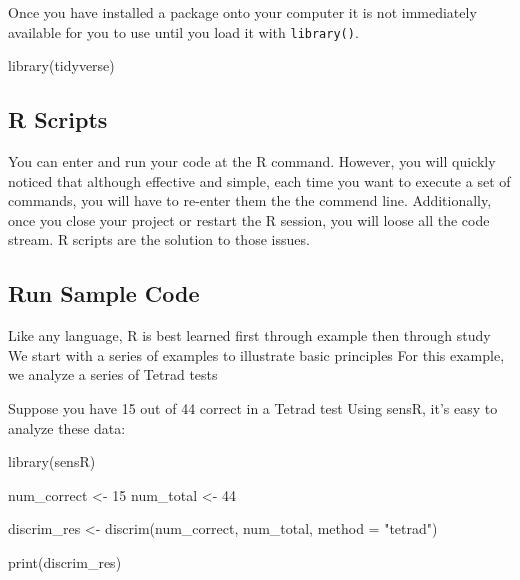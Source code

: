 \documentclass[
]{book}
\newenvironment{Shaded}{\begin{snugshade}}{\end{snugshade}}
\newcommand{\AttributeTok}[1]{\textcolor[rgb]{0.77,0.63,0.00}{#1}}
\newcommand{\DecValTok}[1]{\textcolor[rgb]{0.00,0.00,0.81}{#1}}
\newcommand{\FunctionTok}[1]{\textcolor[rgb]{0.00,0.00,0.00}{#1}}
\newcommand{\NormalTok}[1]{#1}
\newcommand{\OtherTok}[1]{\textcolor[rgb]{0.56,0.35,0.01}{#1}}
\newcommand{\StringTok}[1]{\textcolor[rgb]{0.31,0.60,0.02}{#1}}
\begin{document}
Once you have installed a package onto your computer it is not immediately available for you to use until you load it with \texttt{library()}.

\begin{Shaded}
\begin{Highlighting}[]
\FunctionTok{library}\NormalTok{(tidyverse)}
\end{Highlighting}
\end{Shaded}

\hypertarget{r-scripts}{%
\subsection{R Scripts}\label{r-scripts}}

You can enter and run your code at the R command. However, you will quickly noticed that although effective and simple, each time you want to execute a set of commands, you will have to re-enter them the the commend line. Additionally, once you close your project or restart the R session, you will loose all the code stream. R scripts are the solution to those issues.

\hypertarget{run-sample-code}{%
\subsection{Run Sample Code}\label{run-sample-code}}

Like any language, R is best learned first through example then through study
We start with a series of examples to illustrate basic principles
For this example, we analyze a series of Tetrad tests

Suppose you have 15 out of 44 correct in a Tetrad test
Using sensR, it's easy to analyze these data:

\begin{Shaded}
\begin{Highlighting}[]
\FunctionTok{library}\NormalTok{(sensR)}

\NormalTok{num\_correct }\OtherTok{\textless{}{-}} \DecValTok{15}  
\NormalTok{num\_total }\OtherTok{\textless{}{-}} \DecValTok{44}  
  
\NormalTok{discrim\_res }\OtherTok{\textless{}{-}} \FunctionTok{discrim}\NormalTok{(num\_correct, num\_total, }\AttributeTok{method =} \StringTok{"tetrad"}\NormalTok{)  }
  
\FunctionTok{print}\NormalTok{(discrim\_res)  }
\end{Highlighting}
\end{Shaded}
\end{document}
